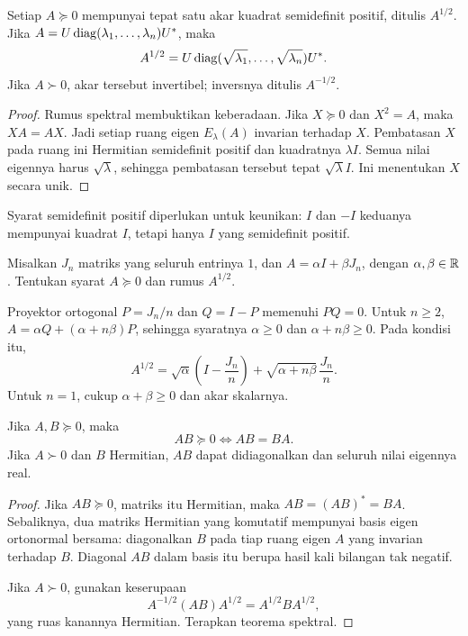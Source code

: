 \begin{teorema}
    Setiap $A\succeq0$ mempunyai tepat satu akar kuadrat
    semidefinit positif, ditulis $A^{1/2}$. Jika
    $A=U\operatorname{diag}(\lambda_1,\ldots,\lambda_n)U^*$, maka
    \[
        A^{1/2}=U\operatorname{diag}(\sqrt{\lambda_1},\ldots,\sqrt{\lambda_n})U^*.
    \]
    Jika $A\succ0$, akar tersebut invertibel; inversnya ditulis $A^{-1/2}$.
\end{teorema}
\begin{proof}
    Rumus spektral membuktikan keberadaan. Jika $X\succeq0$ dan
    $X^2=A$, maka $XA=AX$. Jadi setiap ruang eigen $E_\lambda(A)$
    invarian terhadap $X$. Pembatasan $X$ pada ruang ini Hermitian
    semidefinit positif dan kuadratnya $\lambda I$.
    Semua nilai eigennya harus $\sqrt\lambda$, sehingga pembatasan
    tersebut tepat $\sqrt\lambda I$. Ini menentukan $X$ secara unik.
\end{proof}

Syarat semidefinit positif diperlukan untuk keunikan: $I$ dan $-I$
keduanya mempunyai kuadrat $I$, tetapi hanya $I$ yang semidefinit positif.

\begin{exam}
    Misalkan $J_n$ matriks yang seluruh entrinya $1$, dan
    $A=\alpha I+\beta J_n$, dengan $\alpha,\beta\in\mathbb{R}$.
    Tentukan syarat $A\succeq0$ dan rumus $A^{1/2}$.
\end{exam}
\begin{solution}
    Proyektor ortogonal $P=J_n/n$ dan $Q=I-P$ memenuhi
    $PQ=0$. Untuk $n\ge2$,
    $A=\alpha Q+(\alpha+n\beta)P$, sehingga syaratnya
    $\alpha\ge0$ dan $\alpha+n\beta\ge0$. Pada kondisi itu,
    \[
        A^{1/2}=\sqrt\alpha\left(I-\frac{J_n}{n}\right)
           +\sqrt{\alpha+n\beta}\,\frac{J_n}{n}.
    \]
    Untuk $n=1$, cukup $\alpha+\beta\ge0$ dan akar skalarnya.
\end{solution}

\begin{prop}
    \label{khusus:produk-positif}
    Jika $A,B\succeq0$, maka
    \[
        AB\succeq0\iff AB=BA.
    \]
    Jika $A\succ0$ dan $B$ Hermitian, $AB$ dapat didiagonalkan
    dan seluruh nilai eigennya real.
\end{prop}
\begin{proof}
    Jika $AB\succeq0$, matriks itu Hermitian, maka
    $AB=(AB)^*=BA$. Sebaliknya, dua matriks Hermitian yang komutatif
    mempunyai basis eigen ortonormal bersama: diagonalkan $B$
    pada tiap ruang eigen $A$ yang invarian terhadap $B$.
    Diagonal $AB$ dalam basis itu berupa hasil kali bilangan tak negatif.

    Jika $A\succ0$, gunakan keserupaan
    \[
        A^{-1/2}(AB)A^{1/2}=A^{1/2}BA^{1/2},
    \]
    yang ruas kanannya Hermitian. Terapkan teorema spektral.
\end{proof}

